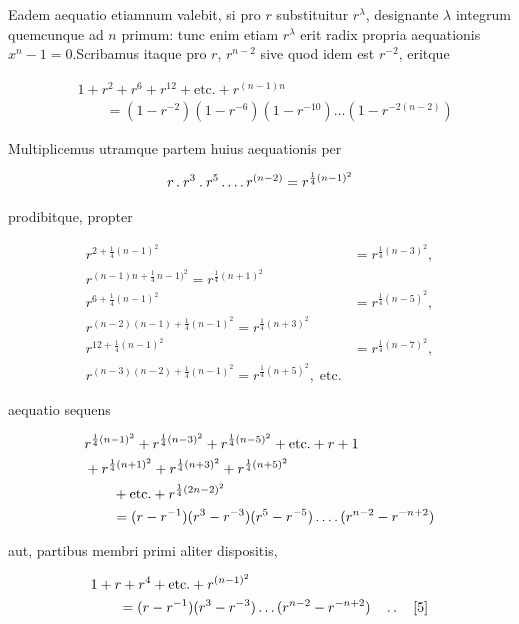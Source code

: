 Eadem aequatio etiamnum valebit, si pro $r$ substituitur $r^\lambda$, designante $\lambda$ integrum quemcunque ad $n$ primum: tunc enim etiam $r^\lambda$ erit radix propria aequationis $x^n-1=0$.\quad Scribamus itaque pro $r$, $r^{n-2}$ sive quod idem est $r^{-2}$, eritque

\[
\begin{aligned}
&1+r^2+r^6+r^{12}+\text{etc.}+r^{(n-1)n}\\&\qquad=(1-r^{-2})(1-r^{-6})(1-r^{-10})\ldots(1-r^{-2(n-2)})
\end{aligned}
\]

Multiplicemus utramque partem huius aequationis per

\[
\begin{aligned}
r\mathbin{.} r^3\mathbin{.} r^5\mathinner{.\,.\,.\,.} r^{(n-2)}=r^{\frac14(n-1)^2}
\end{aligned}
\]

prodibitque, propter

\[
\begin{aligned}
r^{2+\frac14(n-1)^2}&=r^{\frac14(n-3)^2},\\r^{(n-1)n+\frac14\,n-1)^2}=r^{\frac14(n+1)^2}\\
r^{6+\frac14(n-1)^2}&=r^{\frac14(n-5)^2},\\r^{(n-2)(n-1)+\frac14(n-1)^2}=r^{\frac14(n+3)^2}\\
r^{12+\frac14(n-1)^2}&=r^{\frac14(n-7)^2},\\r^{(n-3)(n-2)+\frac14(n-1)^2}=r^{\frac14(n+5)^2},\;\text{etc.}
\end{aligned}
\]

aequatio sequens

\[
\begin{aligned}
&r^{\frac14(n-1)^2}+r^{\frac14(n-3)^2}+r^{\frac14(n-5)^2}+\text{etc.}+r+1\\
&+r^{\frac14(n+1)^2}+r^{\frac14(n+3)^2}+r^{\frac14(n+5)^2}\\&\qquad+\text{etc.}+r^{\frac14(2n-2)^2}\\
&\qquad=(r-r^{-1})(r^3-r^{-3})(r^5-r^{-5})\mathinner{.\,.\,.\,.}(r^{n-2}-r^{-n+2})
\end{aligned}
\]

aut, partibus membri primi aliter dispositis,

\[
\begin{aligned}
&1+r+r^4+\text{etc.}+r^{(n-1)^2}\\&\qquad=(r-r^{-1})(r^3-r^{-3})\ldots(r^{n-2}-r^{-n+2})\quad\mathinner{.\,.}\quad[5]
\end{aligned}
\]

